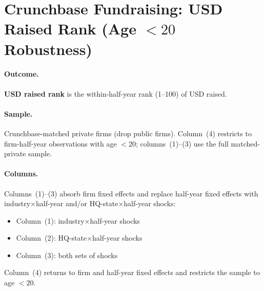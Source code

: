 \documentclass{article}
\newcommand{\cleanedresultsdir}{../results/cleaned/tex}
\begin{document}
\thispagestyle{empty}

\section*{Crunchbase Fundraising: USD Raised Rank (Age $<20$ Robustness)}

\paragraph{Outcome.}
\textbf{USD raised rank} is the within-half-year rank (1--100) of USD raised.

\paragraph{Sample.}
Crunchbase-matched private firms (drop public firms). Column~(4) restricts to firm-half-year observations with age $<20$; columns~(1)--(3) use the full matched-private sample.

\paragraph{Columns.}
Columns~(1)--(3) absorb firm fixed effects and replace half-year fixed effects with industry$\times$half-year and/or HQ-state$\times$half-year shocks:
\begin{itemize}
  \item Column~(1): industry$\times$half-year shocks
  \item Column~(2): HQ-state$\times$half-year shocks
  \item Column~(3): both sets of shocks
\end{itemize}
Column~(4) returns to firm and half-year fixed effects and restricts the sample to age $<20$.

\begin{table}[H]
\caption{\textbf{Crunchbase Fundraising Outcomes: USD Raised Rank (FE Robustness)}}

\end{table}
\end{document}
